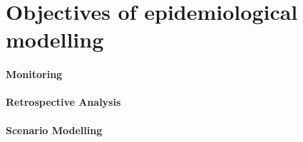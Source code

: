 \section{Objectives of epidemiological modelling}



\paragraph{Monitoring}

\paragraph{Retrospective Analysis}

\paragraph{Scenario Modelling}

